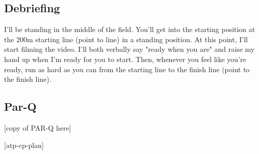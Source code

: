 \documentclass[index]{subfiles}
\begin{document}
\subsection{Debriefing}
I'll be standing in the middle of the field. You'll get into the starting position at the 200m starting line (point to line) in a standing position. At this point, I'll start filming the video. I'll both verbally say "ready when you are" and raise my hand up when I'm ready for you to start. Then, whenever you feel like you're ready, run as hard as you can from the starting line to the finish line (point to the finish line).
\subsection{Par-Q}
[copy of PAR-Q here]

[atp-cp-plan]

\raggedright{}
\printbibliography[heading=bibintoc]
\end{document}
